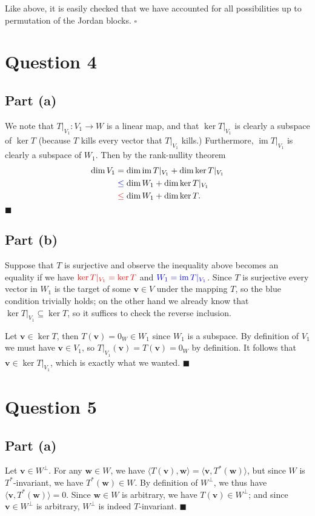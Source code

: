 \documentclass[12pt]{article}
\DeclareMathOperator{\im}{im}
\begin{document}
Like above, it is easily checked that we have accounted for all
possibilities up to
permutation of the Jordan blocks.
\hfill$\square$

\newpage
\section*{Question 4}
\subsection*{Part (a)}

We note that $T|_{V_1}:V_1\to W$ is a linear map, and that
$\ker T|_{V_1}$ is clearly a subspace of $\ker T$ (because $T$ kills every vector
that $T|_{V_1}$ kills.) Furthermore, $\im T|_{V_1}$ is clearly
a subspace of $W_1$.
Then by the rank-nullity theorem
\begin{align*}
    \dim V_1 &= \dim\im T|_{V_1} + \dim\ker T|_{V_1}
           \\&\color{blue}\leq\color{black}
           \dim W_1 + \dim\ker T|_{V_1}
                                       \\&\color{red}\leq\color{black}
            \dim W_1 + \dim \ker T.
\end{align*}
\hfill$\blacksquare$

\subsection*{Part (b)}
Suppose that $T$ is surjective and observe the inequality above becomes an
equality if we have $\color{red}\ker T|_{V_1}=\ker T$ and
$\color{blue}W_1=\im T|_{V_1}$. Since
$T$ is surjective every vector in $W_1$ is the target of some $\mathbf{v}\in V$
under the mapping $T$,
so the blue condition trivially holds; on the other hand we already
know that $\ker T|_{V_1}\subseteq \ker T$, so it suffices to check the reverse
inclusion.

Let $\mathbf{v}\in\ker T$, then $T(\mathbf{v})=0_W\in W_1$
since $W_1$ is a subspace. By definition
of $V_1$ we must have $\mathbf{v}\in V_1$, so $T|_{V_1}(\mathbf{v})=T(\mathbf{v})
=0_W$ by definition. It
follows that $\mathbf{v}\in\ker T|_{V_1}$, which is exactly what we wanted.
\hfill$\blacksquare$

\newpage
\section*{Question 5}
\subsection*{Part (a)}
Let $\mathbf{v}\in W^\perp$. For any $\mathbf{w}\in W$,
we have
$\langle T(\mathbf{v}),\mathbf{w} \rangle=\langle \mathbf{v},
T^*(\mathbf{w}) \rangle$, but since $W$
is $T^*$-invariant, we have $T^*(\mathbf{w})\in W$. By definition of $W^\perp$,
we thus have $\langle \mathbf{v}, T^*(\mathbf{w}) \rangle = 0$.
Since $\mathbf{w}\in W$ is arbitrary, we have $T(\mathbf{v})\in W^\perp$;
and since $\mathbf{v}\in W^\perp$ is arbitrary, $W^\perp$ is indeed
$T$-invariant.
\hfill$\blacksquare$
\end{document}
